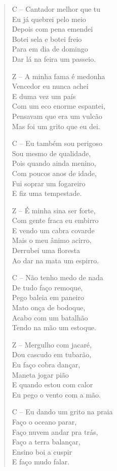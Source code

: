 \begin{verse}
C – Cantador melhor que tu\\
Eu já quebrei pelo meio\\
Depois com pena emendei\\
Botei sela e botei freio\\
Para em dia de domingo\\
Dar lá na feira um passeio.
\pagebreak

Z – A minha fama é medonha\\
Vencedor eu nunca achei\\
E duma vez um país\\
Com um eco enorme espantei,\\
Pensavam que era um vulcão\\
Mas foi um grito que eu dei.

C – Eu também sou perigoso\\
Sou mesmo de qualidade,\\
Pois quando ainda menino,\\
Com poucos anos de idade,\\
Fui soprar um fogareiro\\
E fiz uma tempestade.

Z – É minha sina ser forte,\\
Com gente fraca eu embirro\\
E vendo um cabra covarde\\
Mais o meu ânimo acirro,\\
Derrubei uma floresta\\
Ao dar na mata um espirro.

C – Não tenho medo de nada\\
De tudo faço remoque,\\
Pego baleia em paneiro\\
Mato onça de bodoque,\\
Acabo com um batalhão\\
Tendo na mão um estoque.
\pagebreak

Z – Mergulho com jacaré,\\
Dou cascudo em tubarão,\\
Eu faço cobra dançar,\\
Maneta jogar pião\\
E quando estou com calor\\
Eu pego o vento com a mão.

C – Eu dando um grito na praia\\
Faço o oceano parar,\\
Faço nuvem andar pra trás,\\
Faço a terra balançar,\\
Ensino boi a cuspir\\
E faço mudo falar.


\end{verse}
